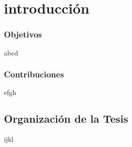 \chapter*{introducción}\label{chapter:introduction}

\subsection*{Objetivos}
abcd

\subsection*{Contribuciones}
efgh

\section*{Organización de la Tesis}
ijkl
